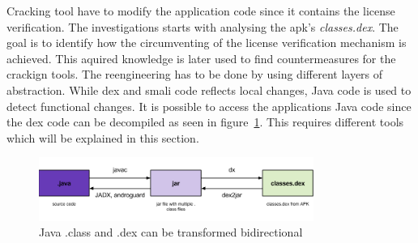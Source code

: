 Cracking tool have to modify the application code since it contains the license verification.
The investigations starts with analysing the \gls{apk}'s \textit{classes.dex}.
The goal is to identify how the circumventing of the license verification mechanism is achieved.
This aquired knowledge is later used to find countermeasures for the crackign tools.
\newline
The reengineering has to be done by using different layers of abstraction.
While dex and smali code reflects local changes, Java code is used to detect functional changes.
It is possible to access the applications Java code since the dex code can be decompiled as seen in figure~\ref{fig:re1}.
This requires different tools which will be explained in this section.
\newline
\begin{figure}[h]
    \centering
    \includegraphics[width=0.8\textwidth]{data/re1.png}
    \caption{Java .class and .dex can be transformed bidirectional \cite{andevconDalvikART}}
    \label{fig:re1}
\end{figure}
